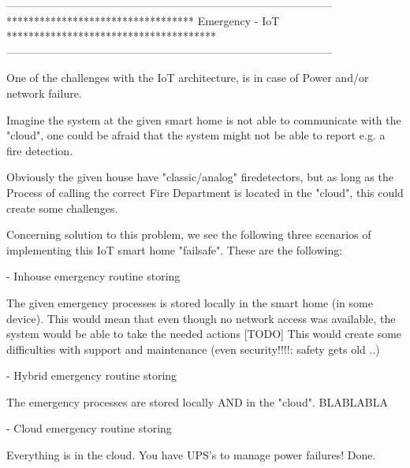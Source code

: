 -----------------------------------------------------------------------------------------
********************************** Emergency - IoT **************************************
-----------------------------------------------------------------------------------------

One of the challenges with the IoT architecture, is in case of Power and/or network failure.

Imagine the system at the given smart home is not able to communicate with the "cloud",
one could be afraid that the system might not be able to report e.g. a fire detection.

Obviously the given house have "classic/analog" firedetectors, but as long as the Process
of calling the correct Fire Department is located in the "cloud", this could create some
challenges.

Concerning solution to this problem, we see the following three scenarios of implementing
this IoT smart home "failsafe". These are the following:

- Inhouse emergency routine storing

	The given emergency processes is stored locally in the smart home (in some device). 
	This would mean that even though no network access was available, the system would 
	be able to take the needed actions
	[TODO] This would create some difficulties with support and maintenance (even security!!!!: safety gets old ..)
	
- Hybrid emergency routine storing

	The emergency processes are stored locally AND in the "cloud". BLABLABLA
	
- Cloud emergency routine storing

	Everything is in the cloud. You have UPS's to manage power failures! Done.



